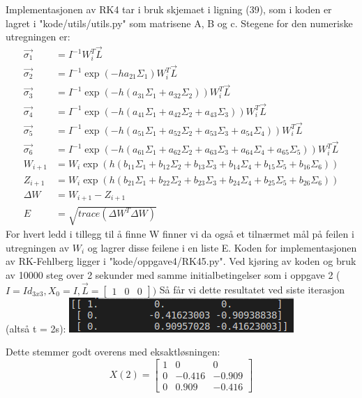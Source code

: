 Implementasjonen av RK4 tar i bruk skjemaet i ligning (39), som i koden er lagret i "kode/utils/utils.py" som matrisene A, B og c.\newline 
Stegene for den numeriske utregningen er: \newline
$$
\begin{aligned}
\vec{\sigma_1} &= I^{-1}W_i^T\vec{L} \\
\vec{\sigma_2} &= I^{-1}\exp(-ha_{21}\Sigma_1)W_i^T\vec{L} \\
\vec{\sigma_3} &= I^{-1}\exp(-h(a_{31}\Sigma_1 + a_{32}\Sigma_2))W_i^T\vec{L}  \\
\vec{\sigma_4} &= I^{-1}\exp(-h(a_{41}\Sigma_1 + a_{42}\Sigma_2 + a_{43}\Sigma_3))W_i^T\vec{L}  \\
\vec{\sigma_5} &= I^{-1}\exp(-h(a_{51}\Sigma_1 + a_{52}\Sigma_2 + a_{53}\Sigma_3 + a_{54}\Sigma_4))W_i^T\vec{L} \\
\vec{\sigma_6} &= I^{-1}\exp(-h(a_{61}\Sigma_1 + a_{62}\Sigma_2 + a_{63}\Sigma_3 + a_{64}\Sigma_4 + a_{65}\Sigma_5))W_i^T\vec{L}  \\
W_{i+1} &= W_i\exp(h(b_{11}\Sigma_1 + b_{12}\Sigma_2 + b_{13}\Sigma_3 + b_{14}\Sigma_4 + b_{15}\Sigma_5 + b_{16}\Sigma_6)) \\
Z_{i+1} &= W_i\exp(h(b_{21}\Sigma_1 + b_{22}\Sigma_2 + b_{23}\Sigma_3 + b_{24}\Sigma_4 + b_{25}\Sigma_5 + b_{26}\Sigma_6)) \\
\Delta W &= W_{i+1} - Z_{i+1} \\
E &= \sqrt{trace(\Delta W^T \Delta W)}
\end{aligned}
$$
For hvert ledd i tillegg til å finne W finner vi da også et tilnærmet mål på feilen i utregningen av $W_{i}$ og lagrer disse feilene i en liste E.\newline \newline
Koden for implementasjonen av RK-Fehlberg ligger i "kode/oppgave4/RK45.py".\newline
Ved kjøring av koden og bruk av 10000 steg over 2 sekunder med samme initialbetingelser som i oppgave 2 ($I=Id_{3x3}, X_0 = I, \vec{L} = \begin{bmatrix} 1 & 0 & 0\end{bmatrix})$ Så får vi dette resultatet ved siste iterasjon (altså t = 2s):\newline
\includegraphics{rapport/resultat/bilder/oppg4_2.png}\newline

Dette stemmer godt overens med eksaktløsningen: \newline
\begin{equation}
    X(2)=\begin{bmatrix}1&0&0\\0&-0.416&-0.909\\0&0.909&-0.416\end{bmatrix}
\end{equation}